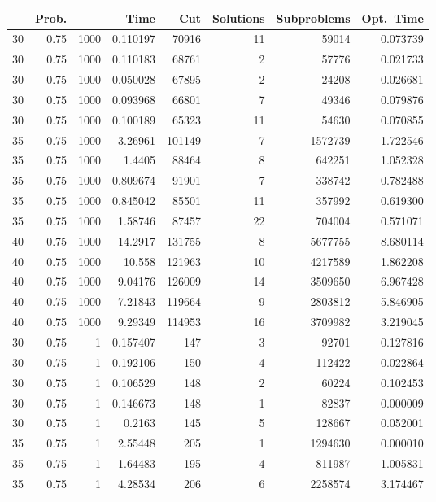 \documentclass[a4paper,11pt]{article}
\begin{document}
\begin{table}
\begin{center}
\begin{tabular}{|rrr|r|r|rr|r|}
\hline
 & Prob. &  & Time & Cut & Solutions & Subproblems & Opt.\ Time \\
\hline
30 & 0.75 & 1000 & 0.110197 & 70916 & 11 & 59014 & 0.073739 \\
30 & 0.75 & 1000 & 0.110183 & 68761 & 2 & 57776 & 0.021733 \\
30 & 0.75 & 1000 & 0.050028 & 67895 & 2 & 24208 & 0.026681 \\
30 & 0.75 & 1000 & 0.093968 & 66801 & 7 & 49346 & 0.079876 \\
30 & 0.75 & 1000 & 0.100189 & 65323 & 11 & 54630 & 0.070855 \\
35 & 0.75 & 1000 & 3.26961 & 101149 & 7 & 1572739 & 1.722546 \\
35 & 0.75 & 1000 & 1.4405 & 88464 & 8 & 642251 & 1.052328 \\
35 & 0.75 & 1000 & 0.809674 & 91901 & 7 & 338742 & 0.782488 \\
35 & 0.75 & 1000 & 0.845042 & 85501 & 11 & 357992 & 0.619300 \\
35 & 0.75 & 1000 & 1.58746 & 87457 & 22 & 704004 & 0.571071 \\
40 & 0.75 & 1000 & 14.2917 & 131755 & 8 & 5677755 & 8.680114 \\
40 & 0.75 & 1000 & 10.558 & 121963 & 10 & 4217589 & 1.862208 \\
40 & 0.75 & 1000 & 9.04176 & 126009 & 14 & 3509650 & 6.967428 \\
40 & 0.75 & 1000 & 7.21843 & 119664 & 9 & 2803812 & 5.846905 \\
40 & 0.75 & 1000 & 9.29349 & 114953 & 16 & 3709982 & 3.219045 \\
\hline
30 & 0.75 & 1 & 0.157407 & 147 & 3 & 92701 & 0.127816 \\
30 & 0.75 & 1 & 0.192106 & 150 & 4 & 112422 & 0.022864 \\
30 & 0.75 & 1 & 0.106529 & 148 & 2 & 60224 & 0.102453 \\
30 & 0.75 & 1 & 0.146673 & 148 & 1 & 82837 & 0.000009 \\
30 & 0.75 & 1 & 0.2163 & 145 & 5 & 128667 & 0.052001 \\
35 & 0.75 & 1 & 2.55448 & 205 & 1 & 1294630 & 0.000010 \\
35 & 0.75 & 1 & 1.64483 & 195 & 4 & 811987 & 1.005831 \\
35 & 0.75 & 1 & 4.28534 & 206 & 6 & 2258574 & 3.174467 \\

\end{tabular}
\end{center}
\end{table}
\end{document}
